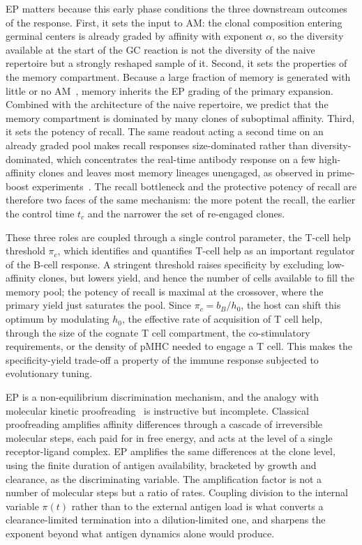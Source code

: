 \documentclass[aps, pre, twocolumn, 10pt, groupedaddress, superscriptaddress, linenumbers]{revtex4-2}
\begin{document}
EP matters because this early phase conditions the three downstream outcomes of the response.
First, it sets the input to AM: the clonal composition entering germinal centers is already graded by affinity with exponent $\alpha$, so the diversity available at the start of the GC reaction is not the diversity of the naive repertoire but a strongly reshaped sample of it.
Second, it sets the properties of the memory compartment.
Because a large fraction of memory is generated with little or no AM~\cite{tangye_human_2007, dogan_multiple_2009, Viant_2020_Fate, Mesin_2020_Restricted_clonality, Glaros_2021_Early_memory}, memory inherits the EP grading of the primary expansion.
Combined with the architecture of the naive repertoire, we predict that the memory compartment is dominated by many clones of suboptimal affinity.
Third, it sets the potency of recall.
The same readout acting a second time on an already graded pool makes recall responses size-dominated rather than diversity-dominated, which concentrates the real-time antibody response on a few high-affinity clones and leaves most memory lineages unengaged, as observed in prime-boost experiments~\cite{Mesin_2020_Restricted_clonality}.
The recall bottleneck and the protective potency of recall are therefore two faces of the same mechanism: the more potent the recall, the earlier the control time $t_c$ and the narrower the set of re-engaged clones.

These three roles are coupled through a single control parameter, the T-cell help threshold $\pi_c$, which identifies and quantifies T-cell help as an important regulator of the B-cell response.
A stringent threshold raises specificity by excluding low-affinity clones, but lowers yield, and hence the number of cells available to fill the memory pool; the potency of recall is maximal at the crossover, where the primary yield just saturates the pool.
Since $\pi_c = b_B/h_0$, the host can shift this optimum by modulating $h_0$, the effective rate of acquisition of T cell help, through the size of the cognate T cell compartment, the co-stimulatory requirements, or the density of pMHC needed to engage a T cell.
This makes the specificity-yield trade-off a property of the immune response subjected to evolutionary tuning.

EP is a non-equilibrium discrimination mechanism, and the analogy with molecular kinetic proofreading~\cite{hopfieldKineticProofreading1974, ninioKineticAmplification1975, mckeithanKineticProofreadingTcell1995} is instructive but incomplete.
Classical proofreading amplifies affinity differences through a cascade of irreversible molecular steps, each paid for in free energy, and acts at the level of a single receptor-ligand complex.
EP amplifies the same differences at the clone level, using the finite duration of antigen availability, bracketed by growth and clearance, as the discriminating variable.
The amplification factor is not a number of molecular steps but a ratio of rates.
Coupling division to the internal variable $\pi(t)$ rather than to the external antigen load is what converts a clearance-limited termination into a dilution-limited one, and sharpens the exponent beyond what antigen dynamics alone would produce.
\end{document}
